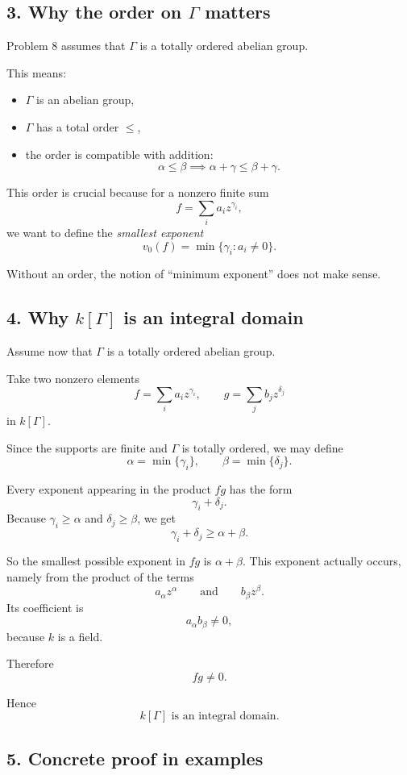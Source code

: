 \documentclass[12pt,a4paper]{article}
\theoremstyle{notespace}
\begin{document}
\subsection{3. Why the order on \(\Gamma\) matters}

Problem 8 assumes that \(\Gamma\) is a totally ordered abelian group.

This means:
\begin{itemize}
	\item \(\Gamma\) is an abelian group,
	\item \(\Gamma\) has a total order \(\le\),
	\item the order is compatible with addition:
	\[
	\alpha\le \beta \implies \alpha+\gamma\le \beta+\gamma.
	\]
\end{itemize}

This order is crucial because for a nonzero finite sum
\[
f=\sum_i a_i z^{\gamma_i},
\]
we want to define the \emph{smallest exponent}
\[
v_0(f)=\min\{\gamma_i : a_i\neq 0\}.
\]

Without an order, the notion of ``minimum exponent'' does not make sense.

\subsection{4. Why \(k[\Gamma]\) is an integral domain}

Assume now that \(\Gamma\) is a totally ordered abelian group.

Take two nonzero elements
\[
f=\sum_i a_i z^{\gamma_i},
\qquad
g=\sum_j b_j z^{\delta_j}
\]
in \(k[\Gamma]\).

Since the supports are finite and \(\Gamma\) is totally ordered, we may define
\[
\alpha=\min\{\gamma_i\},
\qquad
\beta=\min\{\delta_j\}.
\]

Every exponent appearing in the product \(fg\) has the form
\[
\gamma_i+\delta_j.
\]
Because \(\gamma_i\ge \alpha\) and \(\delta_j\ge \beta\), we get
\[
\gamma_i+\delta_j\ge \alpha+\beta.
\]

So the smallest possible exponent in \(fg\) is \(\alpha+\beta\). This exponent actually occurs, namely from the product of the terms
\[
a_\alpha z^\alpha
\qquad \text{and} \qquad
b_\beta z^\beta.
\]
Its coefficient is
\[
a_\alpha b_\beta\neq 0,
\]
because \(k\) is a field.

Therefore
\[
fg\neq 0.
\]

Hence
\[
k[\Gamma] \text{ is an integral domain.}
\]

\subsection{5. Concrete proof in examples}
\end{document}
